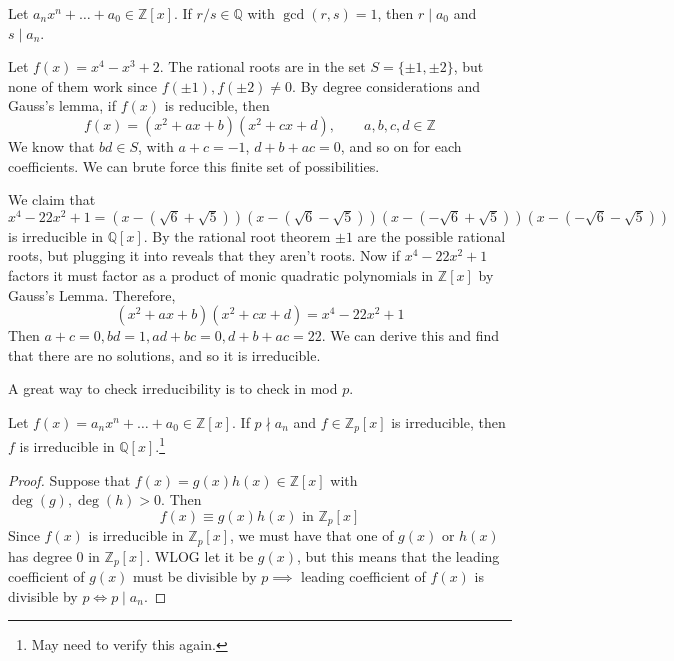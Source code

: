   \begin{corollary}
    Let $a_n x^n + \ldots + a_0 \in \mathbb{Z}[x]$. If $r/s \in \mathbb{Q}$ with $\gcd(r, s) = 1$, then $r \mid a_0$ and $s \mid a_n$. 
  \end{corollary}

  \begin{example}
    Let $f(x) = x^4 - x^3 + 2$. The rational roots are in the set $S = \{\pm 1, \pm2 \}$, but none of them work since $f(\pm1), f(\pm2) \neq 0$. By degree considerations and Gauss's lemma, if $f(x)$ is reducible, then 
    \begin{equation}
      f(x) = (x^2 + ax + b) (x^2 + cx + d), \qquad a, b, c, d \in \mathbb{Z}
    \end{equation}
    We know that $bd \in S$, with $a + c = -1$, $d + b + ac = 0$, and so on for each coefficients. We can brute force this finite set of possibilities. 
  \end{example}

  \begin{example}
    We claim that $x^4 - 22x^2 + 1 = (x - (\sqrt{6} + \sqrt{5})) (x - (\sqrt{6} - \sqrt{5})) (x - (-\sqrt{6} + \sqrt{5})) (x - (-\sqrt{6} - \sqrt{5})) $ is irreducible in $\mathbb{Q} [x]$. By the rational root theorem $\pm 1$ are the possible rational roots, but plugging it into reveals that they aren't roots. Now if $x^4 - 22x^2 + 1$ factors it must factor as a product of monic quadratic polynomials in $\mathbb{Z}[x]$ by Gauss's Lemma. Therefore, 
    \begin{equation}
      (x^2 + ax + b) (x^2 + cx + d) = x^4 - 22x^2 + 1
    \end{equation}
    Then $a + c = 0, bd = 1, ad + bc = 0, d + b + ac = 22$. We can derive this and find that there are no solutions, and so it is irreducible. 
  \end{example}

  A great way to check irreducibility is to check in mod $p$. 

  \begin{theorem}
    Let $f(x) = a_n x^n + \ldots + a_0 \in \mathbb{Z}[x]$. If $p \nmid a_n$ and $f \in \mathbb{Z}_p [x]$ is irreducible, then $f$ is irreducible in $\mathbb{Q}[x]$.\footnote{May need to verify this again.}
  \end{theorem}
  \begin{proof}
    Suppose that $f(x) = g(x) h(x) \in \mathbb{Z}[x]$ with $\deg(g), \deg(h) > 0$. Then 
    \begin{equation}
      f(x) \equiv g(x) h(x) \text{ in } \mathbb{Z}_p [x]
    \end{equation}
    Since $f(x)$ is irreducible in $\mathbb{Z}_p [x]$, we must have that one of $g(x)$ or $h(x)$ has degree $0$ in $\mathbb{Z}_p [x]$. WLOG let it be $g(x)$, but this means that the leading coefficient of $g(x)$ must be divisible by $p \implies$ leading coefficient of $f(x)$ is divisible by $p \iff p \mid a_n$. 
  \end{proof}

